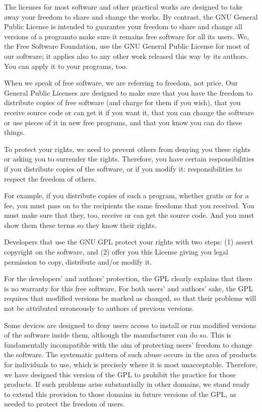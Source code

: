 \documentclass[letterpaper,10pt,english]{sphinxmanual}
\begin{document}
\sphinxAtStartPar
The licenses for most software and other practical works are designed
to take away your freedom to share and change the works.  By contrast,
the GNU General Public License is intended to guarantee your freedom to
share and change all versions of a program\textendash{}to make sure it remains free
software for all its users.  We, the Free Software Foundation, use the
GNU General Public License for most of our software; it applies also to
any other work released this way by its authors.  You can apply it to
your programs, too.

\sphinxAtStartPar
When we speak of free software, we are referring to freedom, not price.  Our General Public Licenses are designed to make sure that you have the freedom to distribute copies of free software (and charge for
them if you wish), that you receive source code or can get it if you
want it, that you can change the software or use pieces of it in new
free programs, and that you know you can do these things.

\sphinxAtStartPar
To protect your rights, we need to prevent others from denying you
these rights or asking you to surrender the rights.  Therefore, you have
certain responsibilities if you distribute copies of the software, or if
you modify it: responsibilities to respect the freedom of others.

\sphinxAtStartPar
For example, if you distribute copies of such a program, whether
gratis or for a fee, you must pass on to the recipients the same
freedoms that you received.  You must make sure that they, too, receive
or can get the source code.  And you must show them these terms so they
know their rights.

\sphinxAtStartPar
Developers that use the GNU GPL protect your rights with two steps:
(1) assert copyright on the software, and (2) offer you this License
giving you legal permission to copy, distribute and/or modify it.

\sphinxAtStartPar
For the developers’ and authors’ protection, the GPL clearly explains
that there is no warranty for this free software.  For both users’ and
authors’ sake, the GPL requires that modified versions be marked as
changed, so that their problems will not be attributed erroneously to
authors of previous versions.

\sphinxAtStartPar
Some devices are designed to deny users access to install or run
modified versions of the software inside them, although the manufacturer
can do so.  This is fundamentally incompatible with the aim of
protecting users’ freedom to change the software.  The systematic
pattern of such abuse occurs in the area of products for individuals to
use, which is precisely where it is most unacceptable.  Therefore, we
have designed this version of the GPL to prohibit the practice for those
products.  If such problems arise substantially in other domains, we
stand ready to extend this provision to those domains in future versions
of the GPL, as needed to protect the freedom of users.
\end{document}
